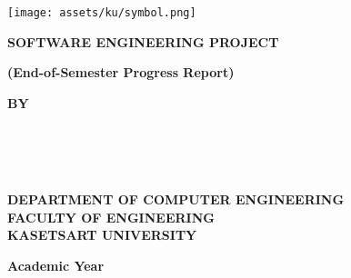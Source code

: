 \thispagestyle{empty}
\begin{center}

    \texttt{[image: assets/ku/symbol.png]}\vspace{.7in}

    {\huge\textbf{SOFTWARE ENGINEERING PROJECT}}\vspace{1in}

    {\huge\textbf{\usevar{\srsTitle}}} %
    {\huge\textbf{(End-of-Semester Progress Report)}}\vspace{1in}
    

    {\huge\textbf{BY}}\vspace{.5in}

    {\huge\textbf{%
        \usevar{\srsAuthorOne} \\
        \usevar{\srsAuthorTwo} \\
        \usevar{\srsAuthorThree} \\
    }}\vfill

    {\Large\textbf{%
        DEPARTMENT OF COMPUTER ENGINEERING\\
        FACULTY OF ENGINEERING\\
        KASETSART UNIVERSITY\\
    }}\vspace{.5in}

    {\LARGE\textbf{Academic Year \usevar{\srsAcademicYear}}}

\end{center}
\restoregeometry
